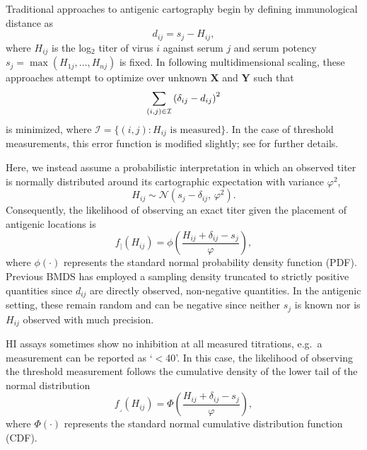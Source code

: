 \documentclass[11pt,oneside,letterpaper]{article}
\newcommand{\viruses}{\mathbf{X}}					%
\newcommand{\sera}{\mathbf{Y}}						%
\newcommand{\se}{s}									%
\newcommand{\point}{f_{\scriptscriptstyle \vert}}	%
\newcommand{\threshold}{f_{\textstyle \lrcorner}}	%
\newcommand{\mdssd}{\varphi}						%
\newcommand{\vn}{n}									%
\newcommand{\normal}{\mathcal{N}}					%
\begin{document}
Traditional approaches to antigenic cartography \cite{Smith04} begin by defining immunological distance as
\begin{equation}
	d_{ij} =  \se_j - H_{ij},
\end{equation}
where $H_{ij}$ is the log$_2$ titer of virus $i$ against serum $j$ and serum potency $\se_j = \max ( H_{1j},\ldots,H_{\vn j} )$ is fixed.
In following multidimensional scaling, these approaches attempt to optimize over unknown $\viruses$ and $\sera$ such that
\begin{equation} \label{mds}
	\sum_{(i,j) \in \cal I} 
	\left(
		\delta_{ij} - d_{ij}
	\right)^2
\end{equation}
is minimized, where $\mathcal{I} = \{ (i,j) : H_{ij} \mbox{ is measured} \}$.
In the case of threshold measurements, this error function is modified slightly; see \cite{Smith04} for further details.

Here, we instead assume a probabilistic interpretation in which an observed titer is normally distributed around its cartographic expectation with variance $\mdssd^2$,
\begin{equation} \label{hij}
	H_{ij} \sim \normal( \se_j - \delta_{ij}, \, \mdssd^2 ).
\end{equation}
Consequently, the likelihood of observing an exact titer given the placement of antigenic locations is 
\begin{equation} 
	\point(H_{ij}) = \phi \left( \frac{ H_{ij} + \delta_{ij} - \se_j }{ \mdssd } \right),
\end{equation}
where $\phi(\cdot)$ represents the standard normal probability density function (PDF).
Previous BMDS has employed a sampling density truncated to strictly positive quantities since $d_{ij}$ are directly observed, non-negative quantities.  
In the antigenic setting, these remain random and can be negative since neither $\se_j$ is known nor is $H_{ij}$ observed with much precision. 

HI assays sometimes show no inhibition at all measured titrations, e.g.\ a measurement can be reported as `$<$40'.
In this case, the likelihood of observing the threshold measurement follows the cumulative density of the lower tail of the normal distribution
\begin{equation} 
	\threshold(H_{ij}) = \Phi \left( \frac{ H_{ij} + \delta_{ij} - \se_j }{ \mdssd } \right),
\end{equation}
where $\Phi(\cdot)$ represents the standard normal cumulative distribution function (CDF).
\end{document}
